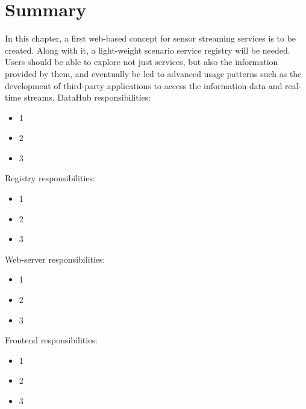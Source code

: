\section{Summary}
	In this chapter, a first web-based concept for sensor streaming services is to be created. Along with it, a light-weight scenario service registry will be needed. Users should be able to explore not just services, but also the information provided by them, and eventually be led to advanced usage patterns such as the development of third-party applications to access the information data and real-time streams.
  \newline
  DataHub responsibilities:
  \begin{itemize}
  \item 1
  \item 2
  \item 3
  \end{itemize}
  Registry responsibilities:
  \begin{itemize}
  \item 1
  \item 2
  \item 3
  \end{itemize}
  Web-server responsibilities:
  \begin{itemize}
  \item 1
  \item 2
  \item 3
  \end{itemize}
  Frontend responsibilities:
  \begin{itemize}
  \item 1
  \item 2
  \item 3
  \end{itemize}